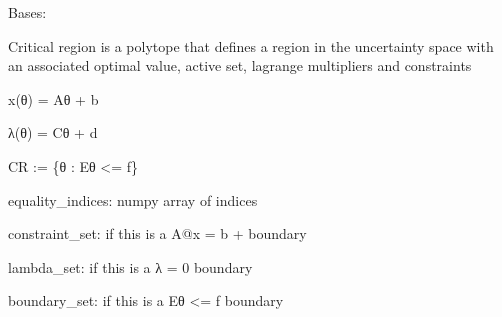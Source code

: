 \documentclass[letterpaper,10pt,english]{sphinxmanual}
\begin{document}
\begin{fulllineitems}
\label{\detokenize{ppopt:ppopt.critical_region.CriticalRegion}}
\sphinxAtStartPar
Bases: 

\sphinxAtStartPar
Critical region is a polytope that defines a region in the uncertainty space
with an associated optimal value, active set, lagrange multipliers and
constraints

\sphinxAtStartPar
x(θ) = Aθ + b

\sphinxAtStartPar
λ(θ) = Cθ + d

\sphinxAtStartPar
CR := \{θ : Eθ \textless{}= f\}

\sphinxAtStartPar
equality\_indices: numpy array of indices

\sphinxAtStartPar
constraint\_set: if this is a A@x = b +  boundary

\sphinxAtStartPar
lambda\_set: if this is a λ = 0 boundary

\sphinxAtStartPar
boundary\_set: if this is a Eθ \textless{}= f boundary

\begin{fulllineitems}
\label{\detokenize{ppopt:ppopt.critical_region.CriticalRegion.A}}
\end{fulllineitems}


\begin{fulllineitems}
\label{\detokenize{ppopt:ppopt.critical_region.CriticalRegion.C}}
\end{fulllineitems}


\end{fulllineitems}
\end{document}
